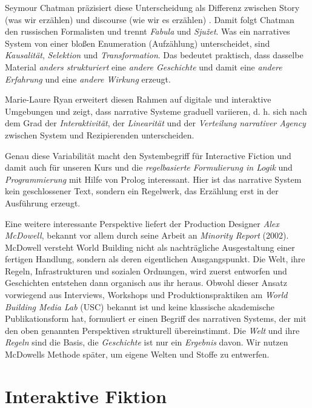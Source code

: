\documentclass[parskip=half,a4paper,11pt]{scrreprt}
\begin{document}
Seymour Chatman präzisiert diese Unterscheidung als Differenz zwischen Story (was wir erzählen) und discourse (wie wir es erzählen) \citep{Chatman1978}. Damit folgt Chatman den russischen Formalisten und trennt \textit{Fabula} und \textit{Sjužet}. Was ein narratives System von einer bloßen Enumeration (Aufzählung) unterscheidet, sind \textit{Kausalität}, \textit{Selektion} und \textit{Transformation}. Das bedeutet praktisch, dass dasselbe Material \textit{anders strukturiert} eine \textit{andere Geschichte} und damit eine \textit{andere Erfahrung} und eine \textit{andere Wirkung} erzeugt.

Marie-Laure Ryan erweitert diesen Rahmen auf digitale und interaktive Umgebungen und zeigt, dass narrative Systeme graduell variieren, d. h. sich nach dem Grad der \textit{Interaktivität}, der \textit{Linearität} und der \textit{Verteilung narrativer Agency} zwischen System und Rezipierenden \citep{Ryan2001} unterscheiden. 

Genau diese Variabilität macht den Systembegriff für Interactive Fiction und damit auch für unseren Kurs und die \textit{regelbasierte Formulierung in Logik} und \textit{Programmierung} mit Hilfe von Prolog interessant. Hier ist das narrative System kein geschlossener Text, sondern ein Regelwerk, das Erzählung erst in der Ausführung erzeugt.

Eine  weitere interessante Perspektive liefert der Production Designer \textit{Alex McDowell}, bekannt vor allem durch seine Arbeit an \textit{Minority Report} (2002). McDowell versteht World Building nicht als nachträgliche Ausgestaltung einer fertigen Handlung, sondern als deren eigentlichen Ausgangspunkt. Die Welt, ihre Regeln, Infrastrukturen und sozialen Ordnungen, wird zuerst entworfen und Geschichten entstehen dann organisch aus ihr heraus. Obwohl dieser Ansatz vorwiegend aus Interviews, Workshops und Produktionspraktiken am \textit{World Building Media Lab} (USC) bekannt ist und keine klassische akademische Publikationsform hat, formuliert er einen Begriff des narrativen Systems, der mit den oben genannten Perspektiven strukturell übereinstimmt. Die \textit{Welt }und ihre \textit{Regeln} sind die Basis, die \textit{Geschichte }ist nur ein \textit{Ergebnis }davon. Wir nutzen McDowells Methode später, um eigene Welten und Stoffe zu entwerfen.

\section{Interaktive Fiktion}
\end{document}
